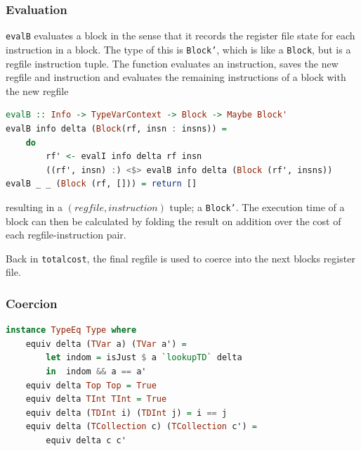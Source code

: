 \subsubsection{Evaluation}
\lstinline{evalB} evaluates a block in the sense that it records the register
file state for each instruction in a block. The type of this is
\texttt{Block'}, which is like a \texttt{Block}, but is a regfile instruction
tuple.
The function evaluates an instruction, saves the new regfile and instruction
and evaluates the remaining instructions of a block with the new regfile
\begin{lstlisting}[language=haskell]
evalB :: Info -> TypeVarContext -> Block -> Maybe Block'
evalB info delta (Block(rf, insn : insns)) =
    do
        rf' <- evalI info delta rf insn
        ((rf', insn) :) <$> evalB info delta (Block (rf', insns))
evalB _ _ (Block (rf, [])) = return []
\end{lstlisting}
resulting in a $(regfile, instruction)$ tuple; a \texttt{Block'}.
The execution time of a block can then be calculated by folding the result on
addition over the cost of each regfile-instruction pair.

Back in \texttt{totalcost}, the final regfile is used to coerce into the next
blocks register file.

\subsubsection{Coercion}
\begin{lstlisting}[language=haskell]
instance TypeEq Type where
    equiv delta (TVar a) (TVar a') =
        let indom = isJust $ a `lookupTD` delta
        in  indom && a == a'
    equiv delta Top Top = True
    equiv delta TInt TInt = True
    equiv delta (TDInt i) (TDInt j) = i == j
    equiv delta (TCollection c) (TCollection c') =
        equiv delta c c'
\end{lstlisting}


